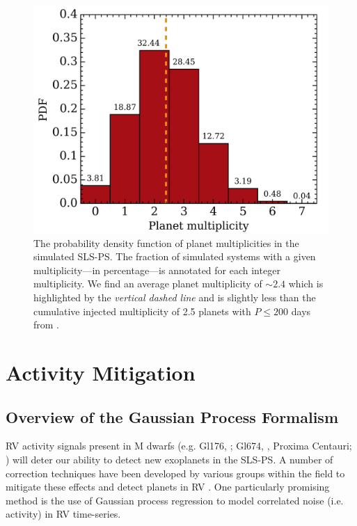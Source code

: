 \begin{figure}
  \centering
  \includegraphics[width=0.6\hsize]{figures/multhist.png}%
  \caption[Histogram of planetary system multiplicities in the simulated SLS-PS.]
      {\small The probability density function of planet multiplicities in the simulated SLS-PS.
    The fraction of simulated systems with a given multiplicity---in percentage---is annotated for
    each integer multiplicity. We find an average planet multiplicity of $\sim 2.4$ which is highlighted by the
    \emph{vertical dashed line} and is slightly less than the cumulative injected multiplicity of 2.5 planets
    with $P\leq 200$ days from \cite{dressing15a}.}
  \label{BSfig:mult}
\end{figure}


\section{Activity Mitigation} \label{BSsect:GP}
\subsection{Overview of the Gaussian Process Formalism}
RV activity signals present in M dwarfs (e.g. Gl176, \citealt{forveille09}; Gl674, \citealt{bonfils07},
Proxima Centauri; \citealt{robertson16}) will deter our ability to detect new exoplanets in the SLS-PS.
A number of correction techniques have been developed by various groups
within the field to mitigate these effects and detect planets in RV \citep[see reviews in][]{fischer16, dumusque17}.
One particularly promising method is the use of Gaussian process regression to model correlated noise (i.e. activity)
in RV time-series.

